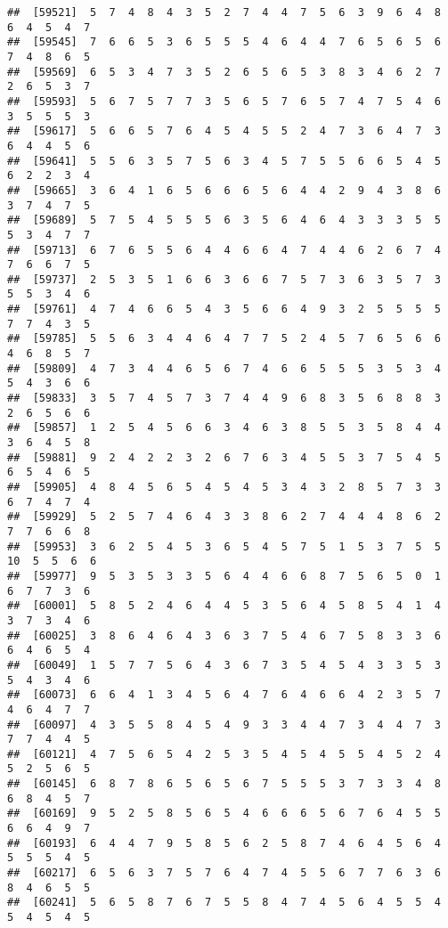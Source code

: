 \documentclass[
]{book}
\begin{document}
\begin{verbatim}
##  [59521]  5  7  4  8  4  3  5  2  7  4  4  7  5  6  3  9  6  4  8  6  4  5  4  7
##  [59545]  7  6  6  5  3  6  5  5  5  4  6  4  4  7  6  5  6  5  6  7  4  8  6  5
##  [59569]  6  5  3  4  7  3  5  2  6  5  6  5  3  8  3  4  6  2  7  2  6  5  3  7
##  [59593]  5  6  7  5  7  7  3  5  6  5  7  6  5  7  4  7  5  4  6  3  5  5  5  3
##  [59617]  5  6  6  5  7  6  4  5  4  5  5  2  4  7  3  6  4  7  3  6  4  4  5  6
##  [59641]  5  5  6  3  5  7  5  6  3  4  5  7  5  5  6  6  5  4  5  6  2  2  3  4
##  [59665]  3  6  4  1  6  5  6  6  6  5  6  4  4  2  9  4  3  8  6  3  7  4  7  5
##  [59689]  5  7  5  4  5  5  5  6  3  5  6  4  6  4  3  3  3  5  5  5  3  4  7  7
##  [59713]  6  7  6  5  5  6  4  4  6  6  4  7  4  4  6  2  6  7  4  7  6  6  7  5
##  [59737]  2  5  3  5  1  6  6  3  6  6  7  5  7  3  6  3  5  7  3  5  5  3  4  6
##  [59761]  4  7  4  6  6  5  4  3  5  6  6  4  9  3  2  5  5  5  5  7  7  4  3  5
##  [59785]  5  5  6  3  4  4  6  4  7  7  5  2  4  5  7  6  5  6  6  4  6  8  5  7
##  [59809]  4  7  3  4  4  6  5  6  7  4  6  6  5  5  5  3  5  3  4  5  4  3  6  6
##  [59833]  3  5  7  4  5  7  3  7  4  4  9  6  8  3  5  6  8  8  3  2  6  5  6  6
##  [59857]  1  2  5  4  5  6  6  3  4  6  3  8  5  5  3  5  8  4  4  3  6  4  5  8
##  [59881]  9  2  4  2  2  3  2  6  7  6  3  4  5  5  3  7  5  4  5  6  5  4  6  5
##  [59905]  4  8  4  5  6  5  4  5  4  5  3  4  3  2  8  5  7  3  3  6  7  4  7  4
##  [59929]  5  2  5  7  4  6  4  3  3  8  6  2  7  4  4  4  8  6  2  7  7  6  6  8
##  [59953]  3  6  2  5  4  5  3  6  5  4  5  7  5  1  5  3  7  5  5 10  5  5  6  6
##  [59977]  9  5  3  5  3  3  5  6  4  4  6  6  8  7  5  6  5  0  1  6  7  7  3  6
##  [60001]  5  8  5  2  4  6  4  4  5  3  5  6  4  5  8  5  4  1  4  3  7  3  4  6
##  [60025]  3  8  6  4  6  4  3  6  3  7  5  4  6  7  5  8  3  3  6  6  4  6  5  4
##  [60049]  1  5  7  7  5  6  4  3  6  7  3  5  4  5  4  3  3  5  3  5  4  3  4  6
##  [60073]  6  6  4  1  3  4  5  6  4  7  6  4  6  6  4  2  3  5  7  4  6  4  7  7
##  [60097]  4  3  5  5  8  4  5  4  9  3  3  4  4  7  3  4  4  7  3  7  7  4  4  5
##  [60121]  4  7  5  6  5  4  2  5  3  5  4  5  4  5  5  4  5  2  4  5  2  5  6  5
##  [60145]  6  8  7  8  6  5  6  5  6  7  5  5  5  3  7  3  3  4  8  6  8  4  5  7
##  [60169]  9  5  2  5  8  5  6  5  4  6  6  6  5  6  7  6  4  5  5  6  6  4  9  7
##  [60193]  6  4  4  7  9  5  8  5  6  2  5  8  7  4  6  4  5  6  4  5  5  5  4  5
##  [60217]  6  5  6  3  7  5  7  6  4  7  4  5  5  6  7  7  6  3  6  8  4  6  5  5
##  [60241]  5  6  5  8  7  6  7  5  5  8  4  7  4  5  6  4  5  5  4  5  4  5  4  5

\end{verbatim}
\end{document}
